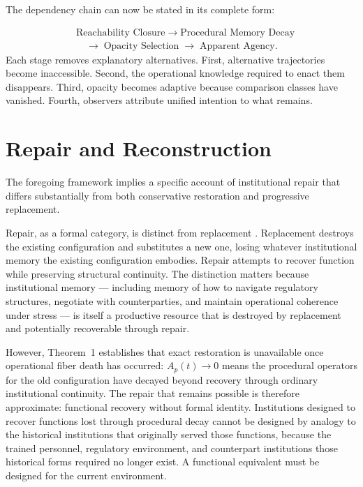 \documentclass[12pt, a4paper]{article}
\theoremstyle{named}
\begin{document}
\newpage

The dependency chain can now be stated in its complete form:

\begin{thmbox}
\[
\begin{aligned}
  &\text{Reachability Closure}
  \;\to\; \text{Procedural Memory Decay} \\
  &\quad\to\; \text{Opacity Selection}
  \;\to\; \text{Apparent Agency.}
\end{aligned}
\]
Each stage removes explanatory alternatives. First, alternative
trajectories become inaccessible. Second, the operational knowledge
required to enact them disappears. Third, opacity becomes adaptive
because comparison classes have vanished. Fourth, observers attribute
unified intention to what remains.
\end{thmbox}

\section{Repair and Reconstruction}

The foregoing framework implies a specific account of institutional
repair that differs substantially from both conservative restoration
and progressive replacement.

Repair, as a formal category, is distinct from replacement
\cite{marcholsen1989,williamson1985}. Replacement destroys the existing
configuration and substitutes a new one, losing whatever institutional
memory the existing configuration embodies. Repair attempts to recover
function while preserving structural continuity. The distinction matters
because institutional memory — including memory of how to navigate
regulatory structures, negotiate with counterparties, and maintain
operational coherence under stress — is itself a productive resource
\cite{hayek1945,nelsonwinter1982} that is destroyed by replacement and
potentially recoverable through repair.

However, Theorem~1 establishes that exact restoration is unavailable
once operational fiber death has occurred: $A_p(t) \to 0$ means the
procedural operators for the old configuration have decayed beyond
recovery through ordinary institutional continuity. The repair that
remains possible is therefore approximate: functional recovery without
formal identity. Institutions designed to recover functions lost through
procedural decay cannot be designed by analogy to the historical
institutions that originally served those functions, because the
trained personnel, regulatory environment, and counterpart institutions
those historical forms required no longer exist. A functional equivalent
must be designed for the current environment.
\end{document}
